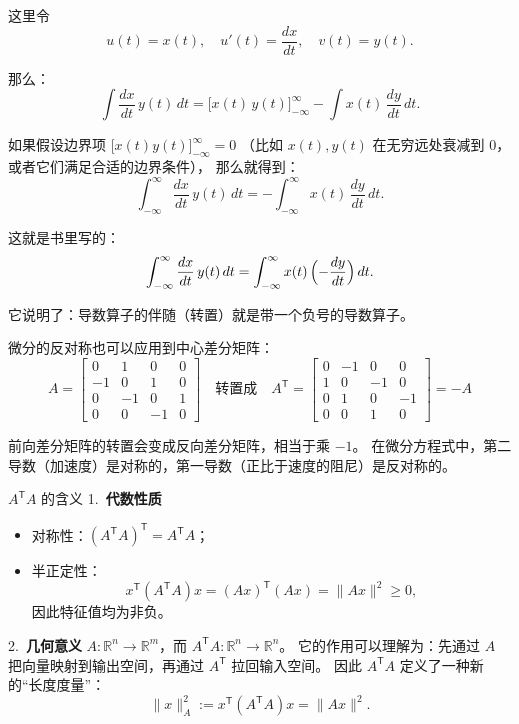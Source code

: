 这里令
\[
u(t) = x(t), \quad u'(t) = \frac{dx}{dt}, \quad v(t) = y(t).
\]

那么：
\[
\int \frac{dx}{dt}\, y(t)\,dt
= \Big[ x(t)\,y(t)\Big]_{-\infty}^{\infty} - \int x(t)\,\frac{dy}{dt}\,dt.
\]

\medskip

如果假设边界项 $\Big[x(t)y(t)\Big]_{-\infty}^\infty=0$ 
（比如 $x(t),y(t)$ 在无穷远处衰减到 0，或者它们满足合适的边界条件），
那么就得到：
\[
\int_{-\infty}^\infty \frac{dx}{dt}\,y(t)\,dt
= -\int_{-\infty}^\infty x(t)\,\frac{dy}{dt}\,dt.
\]

\medskip

这就是书里写的：
\[
\int_{-\infty}^\infty \frac{dx}{dt}\,y(t)\,dt
= \int_{-\infty}^\infty x(t)\,\Bigl(-\frac{dy}{dt}\Bigr)\,dt.
\]

它说明了：导数算子的伴随（转置）就是带一个负号的导数算子。\begin{proposition}
    微分的反对称也可以应用到中心差分矩阵：
\[
A =
\begin{bmatrix}
0 & 1 & 0 & 0 \\
-1 & 0 & 1 & 0 \\
0 & -1 & 0 & 1 \\
0 & 0 & -1 & 0
\end{bmatrix}
\quad
\text{转置成}\quad
A^{\mathsf T} =
\begin{bmatrix}
0 & -1 & 0 & 0 \\
1 & 0 & -1 & 0 \\
0 & 1 & 0 & -1 \\
0 & 0 & 1 & 0
\end{bmatrix}
= -A
\]

前向差分矩阵的转置会变成反向差分矩阵，相当于乘 $-1$。  
在微分方程式中，第二导数（加速度）是对称的，第一导数（正比于速度的阻尼）是反对称的。
\end{proposition}
$A^{\mathsf T}A$ 的含义
1.~\textbf{代数性质}  
\begin{itemize}
  \item 对称性：$(A^{\mathsf T}A)^{\mathsf T} = A^{\mathsf T}A$；
  \item 半正定性：
  \[
  x^{\mathsf T}(A^{\mathsf T}A)x = (Ax)^{\mathsf T}(Ax) = \|Ax\|^2 \geq 0 ,
  \]
  因此特征值均为非负。
\end{itemize}

\medskip

2.~\textbf{几何意义}  
$A: \mathbb R^n \to \mathbb R^m$，而 $A^{\mathsf T}A: \mathbb R^n \to \mathbb R^n$。  
它的作用可以理解为：先通过 $A$ 把向量映射到输出空间，再通过 $A^{\mathsf T}$ 拉回输入空间。  
因此 $A^{\mathsf T}A$ 定义了一种新的“长度度量”：
\[
\|x\|_{A}^2 := x^{\mathsf T}(A^{\mathsf T}A)x = \|Ax\|^2 .
\]

